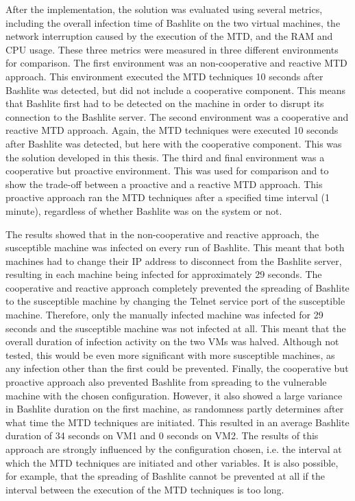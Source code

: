 After the implementation, the solution was evaluated using several metrics, including the overall infection time of Bashlite on the two virtual machines, the network interruption caused by the execution of the MTD, and the RAM and CPU usage. These three metrics were measured in three different environments for comparison. The first environment was an non-cooperative and reactive MTD approach. This environment executed the MTD techniques 10 seconds after Bashlite was detected, but did not include a cooperative component. This means that Bashlite first had to be detected on the machine in order to disrupt its connection to the Bashlite server. The second environment was a cooperative and reactive MTD approach. Again, the MTD techniques were executed 10 seconds after Bashlite was detected, but here with the cooperative component. This was the solution developed in this thesis. The third and final environment was a cooperative but proactive environment. This was used for comparison and to show the trade-off between a proactive and a reactive MTD approach. This proactive approach ran the MTD techniques after a specified time interval (1 minute), regardless of whether Bashlite was on the system or not. 

The results showed that in the non-cooperative and reactive approach, the susceptible machine was infected on every run of Bashlite. This meant that both machines had to change their IP address to disconnect from the Bashlite server, resulting in each machine being infected for approximately 29 seconds. The cooperative and reactive approach completely prevented the spreading of Bashlite to the susceptible machine by changing the Telnet service port of the susceptible machine. Therefore, only the manually infected machine was infected for 29 seconds and the susceptible machine was not infected at all. This meant that the overall duration of infection activity on the two VMs was halved. Although not tested, this would be even more significant with more susceptible machines, as any infection other than the first could be prevented. Finally, the cooperative but proactive approach also prevented Bashlite from spreading to the vulnerable machine with the chosen configuration. However, it also showed a large variance in Bashlite duration on the first machine, as randomness partly determines after what time the MTD techniques are initiated. This resulted in an average Bashlite duration of 34 seconds on VM1 and 0 seconds on VM2. The results of this approach are strongly influenced by the configuration chosen, i.e. the interval at which the MTD techniques are initiated and other variables. It is also possible, for example, that the spreading of Bashlite cannot be prevented at all if the interval between the execution of the MTD techniques is too long.

